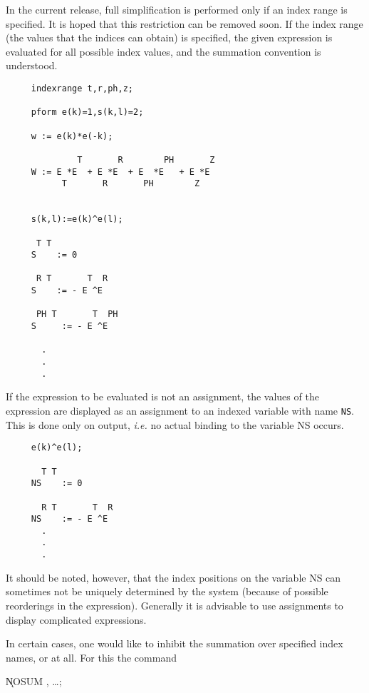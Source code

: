 In the current release, full simplification is performed only if an
index range is specified.  It is hoped that this restriction can be
removed soon.  If the index range (the values that the indices can
obtain) is specified, the given expression is evaluated for all
possible index values, and the summation convention is understood.

\example\label{INDEXRANGE}

\begin{verbatim}
     indexrange t,r,ph,z;

     pform e(k)=1,s(k,l)=2;

     w := e(k)*e(-k);

              T       R        PH       Z
     W := E *E  + E *E  + E  *E   + E *E
           T       R       PH        Z


     s(k,l):=e(k)^e(l);

      T T
     S    := 0

      R T       T  R
     S    := - E ^E

      PH T       T  PH
     S     := - E ^E

       .
       .
       .

\end{verbatim}

If the expression to be evaluated is not an assignment, the values of
the expression are displayed as an assignment to an indexed variable
with name {\tt NS}.  This is done only on output, {\em i.e.} no actual
binding to the variable NS occurs.

\begin{verbatim}
     e(k)^e(l);

       T T
     NS    := 0

       R T       T  R
     NS    := - E ^E
       .
       .
       .
\end{verbatim}

It should be noted, however, that the index positions on the variable
NS can sometimes not be uniquely determined by the system (because of
possible reorderings in the expression). Generally it is advisable to
use assignments to display complicated expressions.

In certain cases, one would like to inhibit the summation over
specified index names, or at all.  For this the command

\hspace*{2em} \k{NOSUM} , \ldots;\label{NOSUM}

